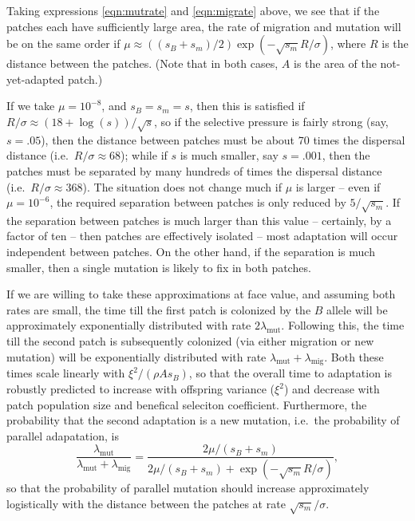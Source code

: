 \documentclass{article}
\newcommand{\migrate}{\lambda_\text{mig}}
\newcommand{\mutrate}{\lambda_\text{mut}}
\begin{document}
Taking expressions \eqref{eqn:mutrate} and \eqref{eqn:migrate} above,
we see that if the patches each have sufficiently large area,
the rate of migration and mutation will be on the same order if 
$\mu \approx ((s_B+s_m)/2) \exp(-\sqrt{s_m} R / \sigma)$,
where $R$ is the distance between the patches.
(Note that in both cases, $A$ is the area of the not-yet-adapted patch.)

If we take $\mu = 10^{-8}$, and $s_B=s_m=s$, then this is satisfied if $R/\sigma \approx (18+\log(s))/\sqrt{s}$,
so if the selective pressure is fairly strong (say, $s=.05$),
then the distance between patches must be about 70 times the dispersal distance (i.e.\ $R/\sigma \approx 68$);
while if $s$ is much smaller, say $s = .001$, 
then the patches must be separated by many hundreds of times the dispersal distance (i.e.\ $R/\sigma \approx 368$).
The situation does not change much if $\mu$ is larger -- even if $\mu = 10^{-6}$, 
the required separation between patches is only reduced by $5/\sqrt{s_m}$.
If the separation between patches is much larger than this value -- certainly, by a factor of ten -- 
then patches are effectively isolated -- most adaptation will occur independent between patches.
On the other hand, if the separation is much smaller, then a single
mutation is likely to fix in both patches.

If we are willing to take these approximations at face value, 
and assuming both rates are small, 
the time till the first patch is colonized by the $B$ allele will be approximately exponentially distributed with rate $2 \mutrate$.
Following this, the time till the second patch is subsequently colonized 
(via either migration or new mutation) 
will be exponentially distributed with rate $\mutrate+\migrate$.
Both these times scale linearly with $\xi^2/(\rho A s_{B})$, so that 
the overall time to adaptation is robustly predicted to increase with offspring variance ($\xi^2$)
and decrease with patch population size and benefical seleciton coefficient.
Furthermore, the probability that the second adaptation is a new mutation,
i.e.\ the probability of parallel adapatation, is
\begin{equation}
  \frac{\mutrate}{\mutrate+\migrate} = \frac{2\mu/(s_B+s_m)}{2\mu/(s_B+s_m) + \exp\left(- \sqrt{s_m} R / \sigma \right) },
\end{equation}
so that the probability of parallel mutation should increase
approximately logistically with the distance between the patches at rate $\sqrt{s_m} /\sigma$. 
\end{document}
